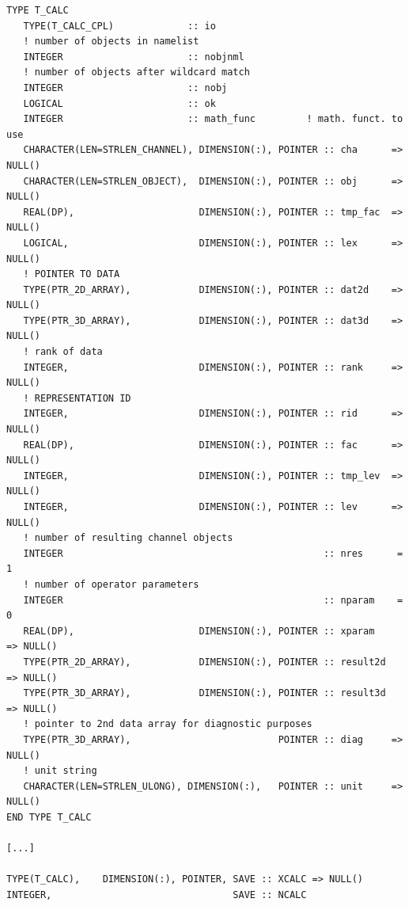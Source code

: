\documentclass[twoside]{article}
\begin{document}
\begin{lstlisting}[language=FORTRAN,
   breaklines=true, %
   basicstyle=\ttfamily,        % the size of the fonts that are used for the code
   breakatwhitespace=false,         % sets if automatic breaks should only happen at whitespace
   prebreak={\raisebox{0ex}[0ex][0ex]{\space\ensuremath{\boldsymbol{\hookleftarrow}}}},
   commentstyle=\color{gray},
   label={lst:XCALC},
   caption = {Definition of the structure variable {\tt CALC}. ({\tt smil/messy\_scalc\_si.f90})}
   ]
TYPE T_CALC
   TYPE(T_CALC_CPL)             :: io
   ! number of objects in namelist
   INTEGER                      :: nobjnml
   ! number of objects after wildcard match
   INTEGER                      :: nobj
   LOGICAL                      :: ok
   INTEGER                      :: math_func         ! math. funct. to use
   CHARACTER(LEN=STRLEN_CHANNEL), DIMENSION(:), POINTER :: cha      => NULL()
   CHARACTER(LEN=STRLEN_OBJECT),  DIMENSION(:), POINTER :: obj      => NULL()
   REAL(DP),                      DIMENSION(:), POINTER :: tmp_fac  => NULL()
   LOGICAL,                       DIMENSION(:), POINTER :: lex      => NULL()
   ! POINTER TO DATA
   TYPE(PTR_2D_ARRAY),            DIMENSION(:), POINTER :: dat2d    => NULL()
   TYPE(PTR_3D_ARRAY),            DIMENSION(:), POINTER :: dat3d    => NULL()
   ! rank of data
   INTEGER,                       DIMENSION(:), POINTER :: rank     => NULL()
   ! REPRESENTATION ID
   INTEGER,                       DIMENSION(:), POINTER :: rid      => NULL()
   REAL(DP),                      DIMENSION(:), POINTER :: fac      => NULL()
   INTEGER,                       DIMENSION(:), POINTER :: tmp_lev  => NULL()
   INTEGER,                       DIMENSION(:), POINTER :: lev      => NULL()
   ! number of resulting channel objects
   INTEGER                                              :: nres      = 1
   ! number of operator parameters
   INTEGER                                              :: nparam    = 0
   REAL(DP),                      DIMENSION(:), POINTER :: xparam    => NULL()
   TYPE(PTR_2D_ARRAY),            DIMENSION(:), POINTER :: result2d  => NULL()
   TYPE(PTR_3D_ARRAY),            DIMENSION(:), POINTER :: result3d  => NULL()
   ! pointer to 2nd data array for diagnostic purposes
   TYPE(PTR_3D_ARRAY),                          POINTER :: diag     => NULL()
   ! unit string
   CHARACTER(LEN=STRLEN_ULONG), DIMENSION(:),   POINTER :: unit     => NULL()
END TYPE T_CALC

[...]

TYPE(T_CALC),    DIMENSION(:), POINTER, SAVE :: XCALC => NULL()
INTEGER,                                SAVE :: NCALC
\end{lstlisting}
%
\end{document}
